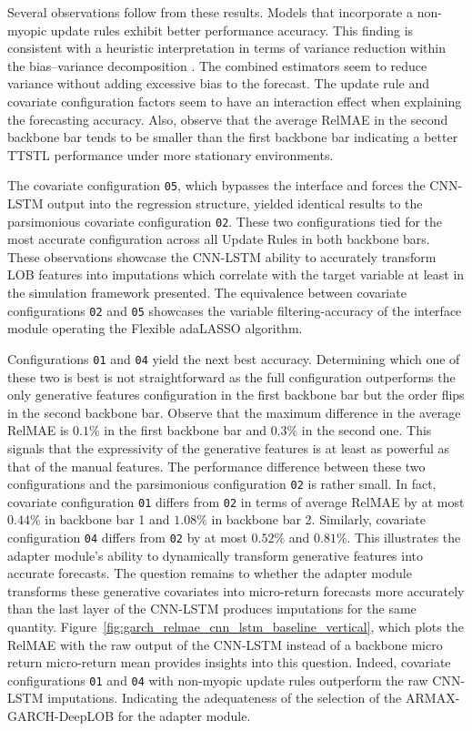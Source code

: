 \documentclass[10pt,a4paper,oneside]{article}
\providecommand{\DIFaddtex}[1]{{\protect\color{blue} \sf #1}} %
\providecommand{\DIFdeltex}[1]{{\protect\color{red} \scriptsize #1}} %
\providecommand{\DIFaddbegin}{} %
\providecommand{\DIFaddend}{} %
\providecommand{\DIFdelbegin}{} %
\providecommand{\DIFdelend}{} %
\providecommand{\DIFadd}[1]{\texorpdfstring{\DIFaddtex{#1}}{#1}} %
\providecommand{\DIFdel}[1]{\texorpdfstring{\DIFdeltex{#1}}{}} %
\newcommand{\DIFscaledelfig}{0.5}
\newlength{\DIFdelgraphicswidth} %
\newlength{\DIFdelgraphicsheight} %
\newcommand{\DIFaddincludegraphics}[2][]{{\color{blue}\fbox{\DIFOincludegraphics[#1]{#2}}}} %
\newcommand{\DIFdelincludegraphics}[2][]{%
\sbox{\DIFdelgraphicsbox}{\DIFOincludegraphics[#1]{#2}}%
\settoboxwidth{\DIFdelgraphicswidth}{\DIFdelgraphicsbox} %
\settoboxtotalheight{\DIFdelgraphicsheight}{\DIFdelgraphicsbox} %
\scalebox{\DIFscaledelfig}{%
\parbox[b]{\DIFdelgraphicswidth}{\usebox{\DIFdelgraphicsbox}\\[-\baselineskip] \rule{\DIFdelgraphicswidth}{0em}}\llap{\resizebox{\DIFdelgraphicswidth}{\DIFdelgraphicsheight}{%
\setlength{\unitlength}{\DIFdelgraphicswidth}%
\begin{picture}(1,1)%
\thicklines\linethickness{2pt} %
{\color[rgb]{1,0,0}\put(0,0){\framebox(1,1){}}}%
{\color[rgb]{1,0,0}\put(0,0){\line( 1,1){1}}}%
{\color[rgb]{1,0,0}\put(0,1){\line(1,-1){1}}}%
\end{picture}%
}\hspace*{3pt}}} %
} %
\DeclareRobustCommand{\DIFaddbegin}{\DIFOaddbegin \let\includegraphics\DIFaddincludegraphics} %
\DeclareRobustCommand{\DIFaddend}{\DIFOaddend \let\includegraphics\DIFOincludegraphics} %
\DeclareRobustCommand{\DIFdelbegin}{\DIFOdelbegin \let\includegraphics\DIFdelincludegraphics} %
\DeclareRobustCommand{\DIFdelend}{\DIFOaddend \let\includegraphics\DIFOincludegraphics} %
\begin{document}
Several observations follow from these results. Models that incorporate a non-myopic update rules exhibit better performance accuracy. This finding is consistent with a heuristic interpretation in terms of variance reduction within the bias–variance decomposition \cite{hastie2017elements}. The combined estimators seem to reduce variance without adding excessive bias to the forecast. The update rule and covariate configuration factors seem to have an interaction effect when explaining the forecasting accuracy. Also, observe that the average RelMAE in the second backbone bar tends to be smaller than the first backbone bar indicating a better TTSTL performance under more stationary environments.

The covariate configuration \verb|05|, which bypasses the interface and forces the CNN-LSTM output into the regression structure, yielded identical results to the parsimonious covariate configuration \verb|02|. These two configurations tied for the most accurate configuration across all Update Rules in both backbone bars. These observations showcase the CNN-LSTM ability to accurately transform LOB features into imputations which correlate with the target variable at least in the simulation framework presented. The equivalence between covariate configurations \verb|02| and \verb|05| showcases the variable filtering-accuracy of the interface module operating the Flexible adaLASSO algorithm.

Configurations \verb|01| and \verb|04| yield the next best accuracy. Determining which one of these two is best is not straightforward as the full configuration outperforms the only generative features configuration in the first backbone bar but the order flips in the second backbone bar. Observe that the maximum difference in the average RelMAE is $0.1\%$ in the first backbone bar and $0.3\%$ in the second one. This signals that the expressivity of the generative features is at least as powerful as that of the manual features. The performance difference between these two configurations and the parsimonious configuration \verb|02| is rather small. In fact, covariate configuration \verb|01| differs from \verb|02| in terms of average RelMAE by at most $0.44\%$ in backbone bar 1 and $1.08\%$ in backbone bar 2. Similarly, covariate configuration \verb|04| differs from \verb|02| by at most $0.52\%$ and $0.81\%$. This illustrates the adapter module's ability to dynamically transform generative features into accurate forecasts. The question remains to whether the adapter module transforms these generative covariates into micro-return forecasts more accurately than the last layer of the CNN-LSTM produces imputations for the same quantity. Figure~\ref{fig:garch_relmae_cnn_lstm_baseline_vertical}, which plots the RelMAE with the raw output of the CNN-LSTM instead of a backbone \DIFdelbegin \DIFdel{micro return }\DIFdelend \DIFaddbegin \DIFadd{micro-return }\DIFaddend mean provides insights into this question. Indeed, covariate configurations \verb|01| and \verb|04| with non-myopic update rules outperform the raw CNN-LSTM imputations. Indicating the adequateness of the selection of the ARMAX-GARCH-DeepLOB for the adapter module.
\end{document}
